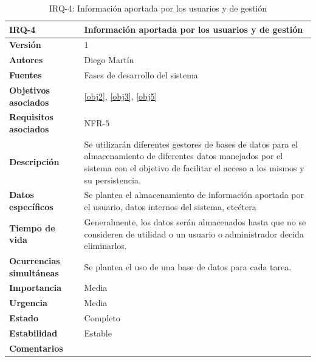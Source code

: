 \begin{table}[H]
\centering
\begin{tabular}{|p{3.5cm}|p{10cm}|}
\hline
\textbf{IRQ-4} &Información aportada por los usuarios y de gestión\\
\hline
\textbf{Versión} & 1\\
\hline
\textbf{Autores} &Diego Martín\\
\hline
\textbf{Fuentes} & Fases de desarrollo del sistema\\
\hline
\textbf{Objetivos asociados} &\ref{obj2}, \ref{obj3}, \ref{obj5}\\
\hline
\textbf{Requisitos asociados} & NFR-5\\
\hline
\textbf{Descripción} &Se utilizarán diferentes gestores de bases de datos para el almacenamiento de diferentes datos manejados por el sistema con el objetivo de facilitar el acceso a los mismos y su persistencia.\\
\hline
\textbf{Datos específicos} &Se plantea el almacenamiento de información aportada por el usuario, datos internos del sistema, etcétera\\
\hline
\textbf{Tiempo de vida} &Generalmente, los datos serán almacenados hasta que no se consideren de utilidad o un usuario o administrador decida eliminarlos.\\
\hline
\textbf{Ocurrencias simultáneas} &Se plantea el uso de una base de datos para cada tarea.\\
\hline
\textbf{Importancia} &Media\\
\hline
\textbf{Urgencia} &Media\\
\hline
\textbf{Estado} &Completo\\
\hline
\textbf{Estabilidad} &Estable\\
\hline
\textbf{Comentarios} &\\
\hline
\end{tabular}
\caption{IRQ-4: Información aportada por los usuarios y de gestión}
\end{table}


